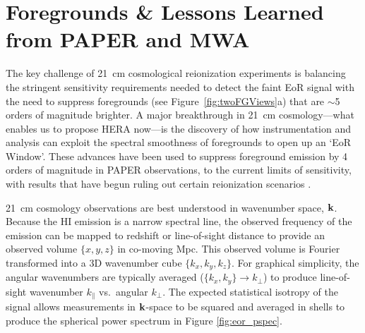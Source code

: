 \documentclass[preprint]{aastex}
\def\kperp{k_{\bot}}
\def\kpar{k_{\|}}
\def\k{{\bf k}}
\def\HI{{H{\small I }}}
\begin{document}

\vspace{-0.25in}
\section{Foregrounds \& Lessons Learned from PAPER and MWA}
\label{LessonsSec}

The key challenge of 21~cm cosmological reionization experiments is 
balancing the stringent sensitivity requirements needed to detect the faint EoR signal
with the need to suppress
foregrounds (see Figure~\ref{fig:twoFGViews}a) that are $\sim$5 orders of magnitude brighter.
A major breakthrough in 21~cm cosmology---what enables us to propose HERA now---is 
the discovery of how 
instrumentation and analysis can exploit the 
spectral smoothness of foregrounds
to open up an `EoR Window'.  
These advances have been used to suppress foreground emission by 4
orders of magnitude in PAPER observations,
to the current limits of sensitivity,
with results that have begun ruling out certain reionization scenarios
\citep{parsons_et_al2013}.

21~cm cosmology observations are best understood in
wavenumber space, $\k$.  Because the \HI emission is a
narrow spectral line, the observed frequency of the emission can be mapped to
redshift or line-of-sight distance to provide an observed volume $\{x,y,z\}$ in
co-moving Mpc. This observed volume is Fourier transformed into a 3D
wavenumber cube $\{k_{x}, k_{y}, k_{z}\}$. For graphical simplicity, the angular
wavenumbers are typically averaged ($\{k_{x},k_{y}\}\rightarrow\kperp$) to
produce line-of-sight wavenumber $\kpar$ vs.\ angular $\kperp$. 
The expected statistical isotropy of the signal allows measurements in $\k$-space to be
squared and averaged in shells to produce the spherical power spectrum
in Figure \ref{fig:eor_pspec}.
\end{document}
